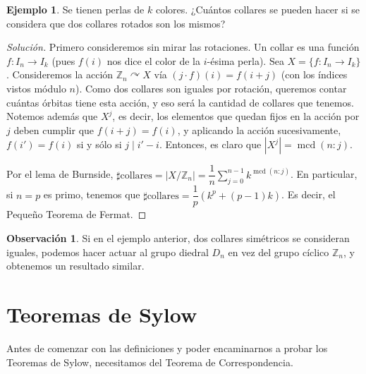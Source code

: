 \documentclass[12pt]{book}
\theoremstyle{definition}
\newtheorem{obs}[teo]{Observación}
\newtheorem{ex}[teo]{Ejemplo}
\newcommand{\ZZ}{\mathbb{Z}}      %
\DeclareMathOperator{\mcd}{mcd}
\def\acts{\curvearrowright}
\begin{document}
\begin{ex}
Se tienen perlas de $k$ colores. ¿Cuántos collares se pueden hacer si se considera que dos collares rotados son los mismos?
\begin{proof}[Solución]
Primero consideremos sin mirar las rotaciones. Un collar es una función $f:I_n\to I_k$ (pues $f(i)$ nos dice el color de la $i$-ésima perla). Sea $X=\{f:I_n\to I_k\}$. Consideremos la acción $\ZZ_n\acts X$ vía $(j\cdot f)(i) = f(i+j)$ (con los índices vistos módulo $n$). Como dos collares son iguales por rotación, queremos contar cuántas órbitas tiene esta acción, y eso será la cantidad de collares que tenemos. Notemos además que $X^j$, es decir, los elementos que quedan fijos en la acción por $j$ deben cumplir que $f(i+j) = f(i)$, y aplicando la acción sucesivamente, $f(i')=f(i)$ si y sólo si $j\mid i'-i$. Entonces, es claro que $|X^j| = \mcd (n:j)$.

Por el lema de Burnside, $\sharp \text{collares} = |X/\ZZ_n| = \dfrac{1}{n}\displaystyle\sum_{j=0}^{n-1} k^{\mcd(n:j)}$. En particular, si $n=p$ es primo, tenemos que $\sharp \text{collares} = \dfrac{1}{p} (k^p + (p-1)k)$. Es decir, el Pequeño Teorema de Fermat.
\end{proof}
\end{ex}
\begin{obs}
Si en el ejemplo anterior, dos collares simétricos se consideran iguales, podemos hacer actuar al grupo diedral $D_n$ en vez del grupo cíclico $\ZZ_n$, y obtenemos un resultado similar.
\end{obs}
\section{Teoremas de Sylow}

Antes de comenzar con las definiciones y poder encaminarnos a probar los Teoremas de Sylow, necesitamos del Teorema de Correspondencia.
\end{document}
